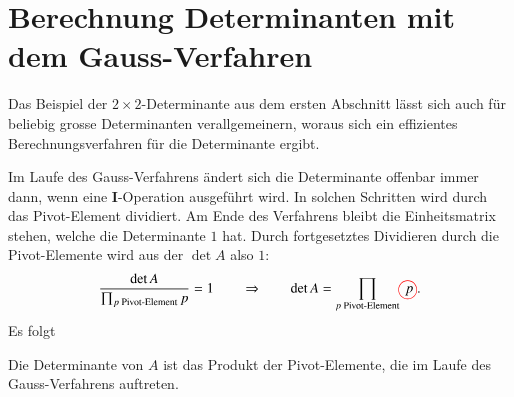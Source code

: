 %
%
%
\section{Berechnung Determinanten mit dem Gauss-Verfahren}
Das Beispiel der $2\times 2$-Determinante aus dem ersten Abschnitt
lässt sich auch für beliebig grosse Determinanten verallgemeinern,
woraus sich ein effizientes Berechnungsverfahren für die Determinante
ergibt.

Im Laufe des Gauss-Verfahrens ändert sich die Determinante offenbar
immer dann, wenn eine {\bf I}-Operation ausgeführt wird.
In solchen Schritten wird durch das Pivot-Element dividiert.
Am Ende des 
Verfahrens bleibt die Einheitsmatrix stehen, welche die Determinante
$1$ hat.
Durch fortgesetztes Dividieren durch die Pivot-Elemente wird
aus der $\det A$ also $1$:
\[
\frac{\det A}{\prod_{\text{$p$ Pivot-Element} }p}=1\qquad\Rightarrow
\qquad
\det A=\prod_{\text{$p$ Pivot-Element}} p%
\begin{picture}(0,0)
\color{red}\put(-4,2){\circle{13}}
\end{picture}%
\;.
\]
Es folgt
\begin{satz}
\label{detprodpivot}
Die Determinante von $A$ ist das Produkt der Pivot-Elemente,
die im Laufe des Gauss-Verfahrens auftreten.
\end{satz}

